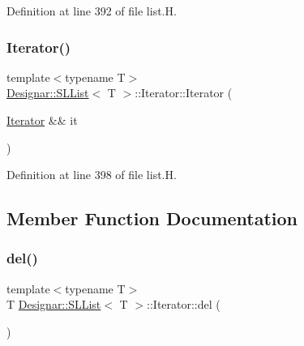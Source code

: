 Definition at line 392 of file list.\+H.

\mbox{\label{class_designar_1_1_s_l_list_1_1_iterator_a2d8fece759af352a51982b4ffb25f351}} 
\subsubsection{\texorpdfstring{Iterator()}{Iterator()}\hspace{0.1cm}{\footnotesize\ttfamily [5/5]}}
{\footnotesize\ttfamily template$<$typename T$>$ \\
\hyperlink{class_designar_1_1_s_l_list}{Designar\+::\+S\+L\+List}$<$ T $>$\+::Iterator\+::\+Iterator (\begin{DoxyParamCaption}\item[{\hyperlink{class_designar_1_1_s_l_list_1_1_iterator}{Iterator} \&\&}]{it }\end{DoxyParamCaption})\hspace{0.3cm}{\ttfamily [inline]}}



Definition at line 398 of file list.\+H.



\subsection{Member Function Documentation}
\mbox{\label{class_designar_1_1_s_l_list_1_1_iterator_ae9fc8898009213695804526b4fe8c2cb}} 
\subsubsection{\texorpdfstring{del()}{del()}}
{\footnotesize\ttfamily template$<$typename T$>$ \\
T \hyperlink{class_designar_1_1_s_l_list}{Designar\+::\+S\+L\+List}$<$ T $>$\+::Iterator\+::del (\begin{DoxyParamCaption}{ }\end{DoxyParamCaption})\hspace{0.3cm}{\ttfamily [inline]}}



